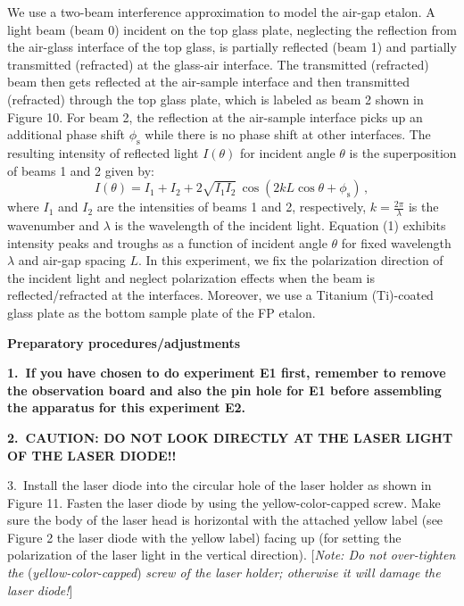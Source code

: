 We use a two-beam interference approximation to model the air-gap etalon. A light beam (beam 0) incident on the top glass plate, neglecting the reflection from the air-glass interface of the top glass, is partially reflected (beam 1) and partially transmitted (refracted) at the glass-air interface. The transmitted (refracted) beam then gets reflected at the air-sample interface and then transmitted (refracted) through the top glass plate, which is labeled as beam 2 shown in Figure 10. For beam 2, the reflection at the air-sample interface picks up an additional phase shift $\phi_\mathrm{s}$ while there is no phase shift at other interfaces. The resulting intensity of reflected light $I(\theta)$ for incident angle $\theta$ is the superposition of beams 1 and 2 given by:
\begin{equation}
I(\theta) = I_1 + I_2 + 2\sqrt{I_1 I_2}\,\cos(2kL\cos\theta + \phi_\mathrm{s})\,, \tag{1}
\end{equation}
where $I_1$ and $I_2$ are the intensities of beams 1 and 2, respectively, $k = \frac{2\pi}{\lambda}$ is the wavenumber and $\lambda$ is the wavelength of the incident light. Equation (1) exhibits intensity peaks and troughs as a function of incident angle $\theta$ for fixed wavelength $\lambda$ and air-gap spacing $L$. In this experiment, we fix the polarization direction of the incident light and neglect polarization effects when the beam is reflected/refracted at the interfaces. Moreover, we use a Titanium (Ti)-coated glass plate as the bottom sample plate of the FP etalon.

{\large\textbf{Preparatory procedures/adjustments}}

\textbf{1.\ If you have chosen to do experiment E1 first, remember to remove the observation board and also the pin hole for E1 before assembling the apparatus for this experiment E2.}

\textbf{2.\ CAUTION: DO NOT LOOK DIRECTLY AT THE LASER LIGHT OF THE LASER DIODE!!}

3.\ Install the laser diode into the circular hole of the laser holder as shown in Figure 11. Fasten the laser diode by using the yellow-color-capped screw. Make sure the body of the laser head is horizontal with the attached yellow label (see Figure 2 the laser diode with the yellow label) facing up (for setting the polarization of the laser light in the vertical direction). [\textit{Note: Do not over-tighten the} (\textit{yellow-color-capped}) \textit{screw of the laser holder; otherwise it will damage the laser diode!}]

